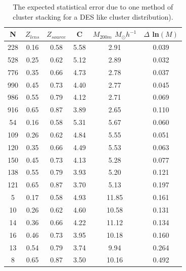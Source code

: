 \begin{table}
        \centering
        \begin{tabular}{|c|c|c|c|c|c|}  
          \hline
          N  &  $Z_{lens}$ & $Z_{source}$  & C & $M_{200m}$ $ M_\odot
          h^{-1}$  & $\Delta$ ln$(M)$ \\ 
          \hline
          228  & 0.16  & 0.58  & 5.58  & 2.91  & 0.039   \\
          \hline
          528  & 0.25  & 0.62  & 5.12  & 2.89  & 0.032   \\
          \hline
          776  & 0.35  & 0.66  & 4.73  & 2.78  & 0.037   \\
          \hline
          990  & 0.45  & 0.73  & 4.40  & 2.77  & 0.045   \\
          \hline
          986  & 0.55  & 0.79  & 4.12  & 2.71  & 0.069   \\
          \hline
          916  & 0.65  & 0.87  & 3.89  & 2.65  & 0.110   \\
          \hline
         54  & 0.16  & 0.58  & 5.31  & 5.67  & 0.060  \\
         \hline
         109  & 0.26  & 0.62  & 4.84  & 5.55  & 0.051   \\
         \hline
         120  & 0.35  & 0.66  & 4.49  & 5.53  & 0.063   \\
         \hline
         150  & 0.45  & 0.73  & 4.13  & 5.28  & 0.077   \\
         \hline
         138  & 0.55  & 0.79  & 3.93  & 5.20  & 0.121   \\
         \hline
         121  & 0.65  & 0.87  & 3.70  & 5.13  & 0.197  \\
          \hline
          5  & 0.17  & 0.58  & 4.93  & 11.85  & 0.161   \\
          \hline
          10  & 0.26  & 0.62  & 4.60  & 10.58  & 0.131   \\
          \hline
          14  & 0.36  & 0.66  & 4.22  & 11.12  & 0.134   \\
          \hline
          16  & 0.46  & 0.73  & 3.95  & 10.18  & 0.160   \\
          \hline
          13  & 0.54  & 0.79  & 3.74  & 9.94  & 0.264   \\
          \hline
          8  & 0.65  & 0.87  & 3.50  & 10.16  & 0.492   \\
          \hline
        \end{tabular}
        \caption{ The expected statistical error due to one method of
          cluster stacking for a DES like cluster distribution).}
    \label{table:NWF_4_b}
\end{table}